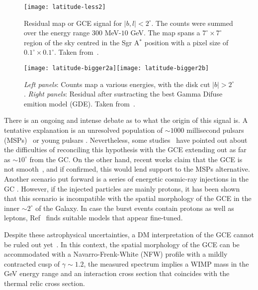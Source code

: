 \begin{figure}[h]
\begin{center}
\texttt{[image: latitude-less2]}
\end{center}
\caption{Residual map or GCE signal for $|b,l|<2^{\circ}$. The counts were summed over the energy range 
$300$ MeV-$10$ GeV. The map spans a $7^{\circ}\times 7^{\circ}$ region of the sky centred in the Sgr A$^*$ position with a pixel size of $0.1^{\circ}\times 0.1^{\circ}$. Taken from~\cite{GordonMacias2013}.}
\label{fig:GCE-less2}
\end{figure}
%
\begin{figure}[h]
\begin{center}
\texttt{[image: latitude-bigger2a]}\texttt{[image: latitude-bigger2b]}
\end{center}
\caption{\textit{Left panels}: Counts map a various energies, with the disk cut $|b|>2^{\circ}$. \textit{Right panels}: Residual after sustracting the best Gamma Difuse emition model (GDE). Taken from~\cite{CaloreCholisWeniger2015}.}
\label{fig:GCE-bigger2}
\end{figure} 

There is an ongoing and intense debate as to what the origin of this signal is. A tentative explanation is an unresolved population of $\sim 1000$ millisecond pulsars (MSPs)~\cite{Abazajian:2010zy,AbazajianKaplinghat2012,Wharton2012,GordonMacias2013,GordonMacias2013erratum,Mirabal2013,MaciasGordon2014,YuanZhang2014,BrandtKocsis2015,Lacroix:2015wfx,O'Leary:2016osi} or young pulsars \cite{OLeary2015,O'Leary:2016osi}.
 Nevertheless, some studies~\cite{Hooper2013,CholisHooperLinden2015,PetrovicSerpicoZaharijas2015,Lee2015,BartelsKrishnamurthyWeniger2015,Linden2015} have pointed out about the difficulties of reconciling this hypothesis with the GCE extending out as far as $\sim 10^\circ$ from the GC. On the other hand, recent works claim that the GCE is not smooth~\cite{Lee:2015fea,Bartels:2015aea}, and if confirmed, this would lend support to the MSPs alternative.
 Another scenario put forward is a series of energetic cosmic-ray injections in the GC \cite{CarlsonProfumo,Petrovic2014}.
 However, if the injected particles are mainly protons, it has been shown~\cite{MacGorCroProf2015} that this scenario is incompatible with the spatial morphology of the GCE in the inner $\sim 2^\circ$ of the Galaxy.
 In case the burst events contain protons as well as leptons, Ref~\cite{Cholis2015} finds suitable models that appear fine-tuned.

Despite these astrophysical uncertainties, a DM interpretation of the GCE cannot be ruled out yet~\cite{Goodenough2009gk,Hooper:2010mq,hooper,AbazajianKaplinghat2012,AbazajianKaplinghat2013,GordonMacias2013,MaciasGordon2014,Abazajian2014,Daylan:2014,Lacroix:2015wfx}.
   In this context, the spatial morphology of the GCE can be accommodated with a Navarro-Frenk-White (NFW) profile with a mildly contracted cusp of $\gamma\sim 1.2$, the measured spectrum implies a WIMP mass in the GeV energy range and an interaction cross section that coincides with the thermal relic cross section. 

